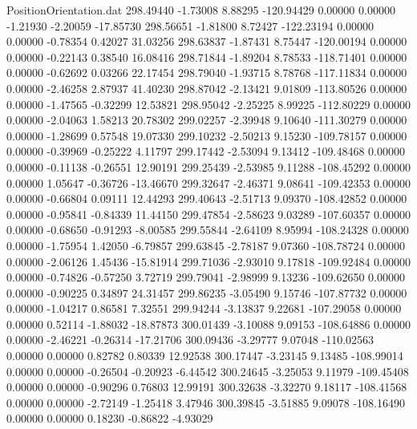 \begin{filecontents}{PositionOrientation.dat}
 298.49440   -1.73008    8.88295  -120.94429    0.00000    0.00000   -1.21930   -2.20059  -17.85730
 298.56651   -1.81800    8.72427  -122.23194    0.00000    0.00000   -0.78354    0.42027   31.03256
 298.63837   -1.87431    8.75447  -120.00194    0.00000    0.00000   -0.22143    0.38540   16.08416
 298.71844   -1.89204    8.78533  -118.71401    0.00000    0.00000   -0.62692    0.03266   22.17454
 298.79040   -1.93715    8.78768  -117.11834    0.00000    0.00000   -2.46258    2.87937   41.40230
 298.87042   -2.13421    9.01809  -113.80526    0.00000    0.00000   -1.47565   -0.32299   12.53821
 298.95042   -2.25225    8.99225  -112.80229    0.00000    0.00000   -2.04063    1.58213   20.78302
 299.02257   -2.39948    9.10640  -111.30279    0.00000    0.00000   -1.28699    0.57548   19.07330
 299.10232   -2.50213    9.15230  -109.78157    0.00000    0.00000   -0.39969   -0.25222    4.11797
 299.17442   -2.53094    9.13412  -109.48468    0.00000    0.00000   -0.11138   -0.26551   12.90191
 299.25439   -2.53985    9.11288  -108.45292    0.00000    0.00000    1.05647   -0.36726  -13.46670
 299.32647   -2.46371    9.08641  -109.42353    0.00000    0.00000   -0.66804    0.09111   12.44293
 299.40643   -2.51713    9.09370  -108.42852    0.00000    0.00000   -0.95841   -0.84339   11.44150
 299.47854   -2.58623    9.03289  -107.60357    0.00000    0.00000   -0.68650   -0.91293   -8.00585
 299.55844   -2.64109    8.95994  -108.24328    0.00000    0.00000   -1.75954    1.42050   -6.79857
 299.63845   -2.78187    9.07360  -108.78724    0.00000    0.00000   -2.06126    1.45436  -15.81914
 299.71036   -2.93010    9.17818  -109.92484    0.00000    0.00000   -0.74826   -0.57250    3.72719
 299.79041   -2.98999    9.13236  -109.62650    0.00000    0.00000   -0.90225    0.34897   24.31457
 299.86235   -3.05490    9.15746  -107.87732    0.00000    0.00000   -1.04217    0.86581    7.32551
 299.94244   -3.13837    9.22681  -107.29058    0.00000    0.00000    0.52114   -1.88032  -18.87873
 300.01439   -3.10088    9.09153  -108.64886    0.00000    0.00000   -2.46221   -0.26314  -17.21706
 300.09436   -3.29777    9.07048  -110.02563    0.00000    0.00000    0.82782    0.80339   12.92538
 300.17447   -3.23145    9.13485  -108.99014    0.00000    0.00000   -0.26504   -0.20923   -6.44542
 300.24645   -3.25053    9.11979  -109.45408    0.00000    0.00000   -0.90296    0.76803   12.99191
 300.32638   -3.32270    9.18117  -108.41568    0.00000    0.00000   -2.72149   -1.25418    3.47946
 300.39845   -3.51885    9.09078  -108.16490    0.00000    0.00000    0.18230   -0.86822   -4.93029

\end{filecontents}
